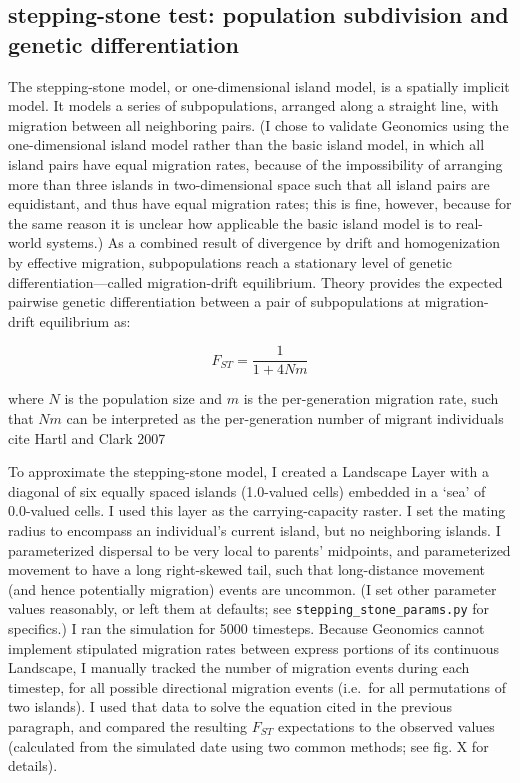 ﻿\documentclass{article}
\begin{document}
\subsection{stepping-stone test: population subdivision and genetic differentiation}
The stepping-stone model, or one-dimensional island model, is a spatially implicit model.
It models a series of subpopulations, arranged along a straight line,
with migration between all neighboring pairs. (I chose to validate Geonomics using
the one-dimensional island model rather than the basic island model, in which all
island pairs have equal migration rates, because of the impossibility of arranging
more than three islands in two-dimensional space such that all island pairs are
equidistant, and thus have equal migration rates; this is fine, however, because for
the same reason it is unclear how applicable the basic island model is to real-world
systems.) As a combined result of divergence by drift and homogenization
by effective migration, subpopulations reach a stationary level 
of genetic differentiation---called migration-drift equilibrium. 
Theory provides the expected pairwise genetic differentiation
between a pair of subpopulations at migration-drift equilibrium
as:

\begin{equation}
F_{ST} = \frac{1}{1 + 4Nm}
\end{equation}

where $N$ is the population size and $m$ is the per-generation migration rate,
such that $Nm$ can be interpreted as the per-generation number of migrant
individuals {\large cite  Hartl and Clark 2007}

To approximate the stepping-stone model, I created a Landscape Layer with
a diagonal of six equally spaced islands (1.0-valued cells) embedded in 
a `sea' of 0.0-valued cells. I used this layer as the carrying-capacity raster. I set the
mating radius to encompass an individual's current island, but no neighboring islands. I
parameterized dispersal to be very local to parents' midpoints, and
parameterized movement to have a long right-skewed tail, such that long-distance movement
(and hence potentially migration) events are uncommon.
(I set other parameter values reasonably, or left them at defaults; see 
\texttt{stepping\_stone\_params.py} for specifics.) I ran the simulation for 5000 timesteps.
Because Geonomics cannot implement stipulated migration rates between
express portions of its continuous Landscape, I manually tracked the number of
migration events during each timestep, for all possible directional migration events 
(i.e.\ for all permutations of two islands). I used that data to solve the equation cited in the previous paragraph, and compared the resulting $F_{ST}$ expectations to the observed
values (calculated from the simulated date using two common methods;
see fig. X for details).
\end{document}
